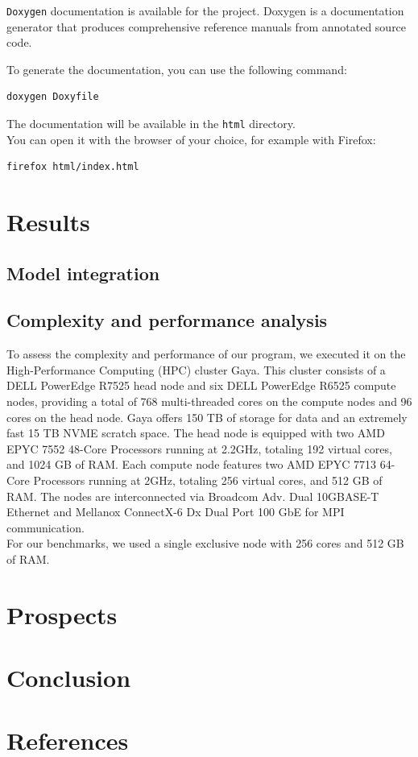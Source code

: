 \documentclass[12pt]{article}
\begin{document}
\texttt{Doxygen}\cite{doxygen} documentation is available for the project. Doxygen is a
documentation generator that produces comprehensive reference manuals from
annotated source code.

To generate the documentation, you can use the following command:

\begin{lstlisting}[language=bash]
doxygen Doxyfile
\end{lstlisting}

The documentation will be available in the \texttt{html} directory.\\
You can open it with the browser of your choice, for example with Firefox:

\begin{lstlisting}[language=bash]
firefox html/index.html
\end{lstlisting}

\newpage

\section{Results}
\label{sec:Results}
\subsection{Model integration}


\subsection{Complexity and performance analysis}

To assess the complexity and performance of our program, we executed it on
the High-Performance Computing (HPC) cluster Gaya. This cluster consists of a
DELL PowerEdge R7525 head node and six DELL PowerEdge R6525 compute nodes,
providing a total of 768 multi-threaded cores on the compute nodes and 96 cores
on the head node. Gaya offers 150 TB of storage for data and an extremely fast
15 TB NVME scratch space. The head node is equipped with two AMD EPYC 7552
48-Core Processors running at 2.2GHz, totaling 192 virtual cores, and 1024
GB of RAM. Each compute node features two AMD EPYC 7713 64-Core Processors
running at 2GHz, totaling 256 virtual cores, and 512 GB of RAM.
The nodes are interconnected via Broadcom Adv. Dual 10GBASE-T Ethernet and
Mellanox ConnectX-6 Dx Dual Port 100 GbE for MPI communication.\\
For our benchmarks, we used a single exclusive node with 256 cores and 512 GB
of RAM.


\section{Prospects}


\section{Conclusion}

\newpage

\section{References}


\end{document}
